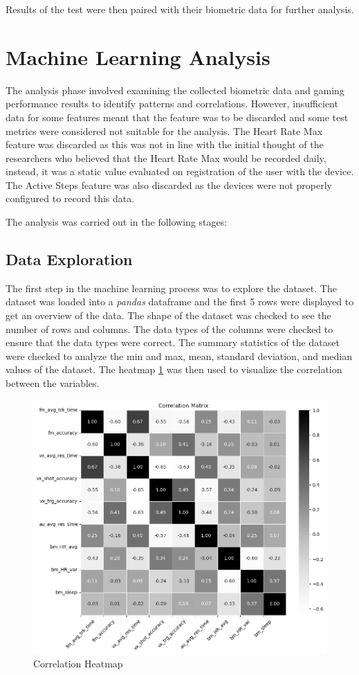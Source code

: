 Results of the test were then paired with their biometric data for further analysis.


\section{Machine Learning Analysis}
The analysis phase involved examining the collected biometric data and gaming performance results to identify patterns and correlations. However, insufficient data for some
features meant that the feature was to be discarded and some test metrics were considered not suitable for the analysis. The Heart Rate Max feature was discarded
as this was not in line with the initial thought of the researchers who believed that the Heart Rate Max would be recorded daily, instead, it was a static value evaluated
on registration of the user with the device. The Active Steps feature was also discarded as the devices were not properly configured to record this data. 

The analysis was carried out in the following stages:

\subsection{Data Exploration}
The first step in the machine learning process was to explore the dataset. The dataset was loaded into a \textit{pandas} dataframe and the first 5 rows were displayed to get an overview of the
data. The shape of the dataset was checked to see the number of rows and columns. The data types of the columns were checked to ensure that the data types were correct. The summary
statistics of the dataset were checked to analyze the min and max, mean, standard deviation, and median values of the dataset. The heatmap \ref{fig:correlation_heatmap} was then used to
visualize the correlation between the variables.

\begin{figure}[H]
    \centering
    \includegraphics[width=1\textwidth]{images/corr_matrix.png}
    \caption{Correlation Heatmap}
    \label{fig:correlation_heatmap}
\end{figure}

